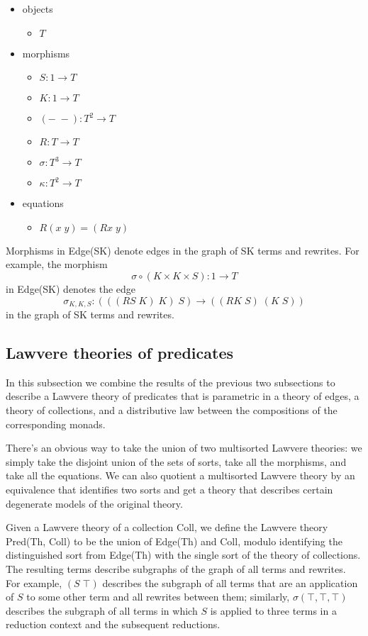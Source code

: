 \documentclass[a4paper,UKenglish]{article}
\newcommand{\maps}{\colon}
\begin{document}
\begin{itemize}
  \item objects
    \begin{itemize}
      \item $T$
    \end{itemize}
  \item morphisms
    \begin{itemize}
      \item $S\maps 1 \to T$
      \item $K\maps 1 \to T$
      \item $(-\; -)\maps T^2 \to T$
      \item $R\maps T \to T$
      \item $\sigma\maps T^3 \to T$
      \item $\kappa\maps T^2 \to T$
    \end{itemize}
  \item equations
    \begin{itemize}
      \item $R(x\; y) = (Rx\; y)$
    \end{itemize}
\end{itemize}

Morphisms in Edge(SK) denote edges in the graph of SK terms and rewrites.  For example, the morphism 
\[\sigma \circ (K \times K \times S)\maps 1 \to T\]
in Edge(SK) denotes the edge
\[\sigma_{K,K,S}\maps (((RS\; K)\; K)\; S) \to ((RK\; S)\; (K\; S))\]
in the graph of SK terms and rewrites.

\subsection{Lawvere theories of predicates}

In this subsection we combine the results of the previous two subsections to describe a Lawvere theory of predicates that is parametric in a theory of edges, a theory of collections, and a distributive law between the compositions of the corresponding monads.  

There's an obvious way to take the union of two multisorted Lawvere theories: we simply take the disjoint union of the sets of sorts, take all the morphisms, and take all the equations.  We can also quotient a multisorted Lawvere theory by an equivalence that identifies two sorts and get a theory that describes certain degenerate models of the original theory.

Given a Lawvere theory of a collection Coll, we define the Lawvere theory Pred(Th, Coll) to be the union of Edge(Th) and Coll, modulo identifying the distinguished sort from Edge(Th) with the single sort of the theory of collections.  The resulting terms describe subgraphs of the graph of all terms and rewrites.  For example, $(S\; \top)$ describes the subgraph of all terms that are an application of $S$ to some other term and all rewrites between them; similarly, $\sigma(\top, \top, \top)$ describes the subgraph of all terms in which $S$ is applied to three terms in a reduction context and the subsequent reductions.
\end{document}
